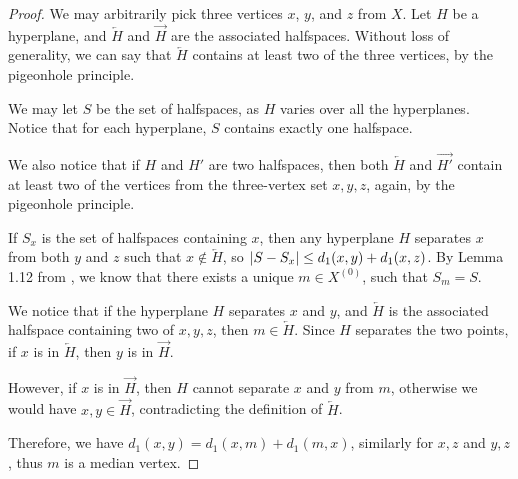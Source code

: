 \documentclass[12pt, a4paper]{article}
\theoremstyle{plain}
\theoremstyle{definition}
\theoremstyle{remark}
\begin{document}
    \begin{proof}
        We may arbitrarily pick three vertices $x$, $y$, and $z$ from $X$. Let $H$ be a hyperplane, and $\overleftarrow{H}$ and $\overrightarrow{H}$ are the associated halfspaces. Without loss of generality, we can say that $\overleftarrow{H}$ contains at least two of the three vertices, by the pigeonhole principle.
        
        We may let $S$ be the set of halfspaces, as $H$ varies over all the hyperplanes. Notice that for each hyperplane, $S$ contains exactly one halfspace.
        
        We also notice that if $H$ and $H'$ are two halfspaces, then both $\overleftarrow{H}$ and $\overrightarrow{H'}$ contain at least two of the vertices from the three-vertex set ${ x, y, z}$, again, by the pigeonhole principle.
        
        If $S_{x}$ is the set of halfspaces containing $x$, then any hyperplane $H$ separates $x$ from both $y$ and $z$ such that $x \notin \overleftarrow{H}$, so $\abs{S - S_{x}} \leq d_{1}(x, y) + d_{1}(x, z)$. By Lemma 1.12 from \cite{hagen}, we know that there exists a unique $m \in X^{(0)}$, such that $S_{m} = S$.
        
        We notice that if the hyperplane $H$ separates $x$ and $y$, and $\overleftarrow{H}$ is the associated halfspace containing two of ${ x, y, z}$, then $m \in \overleftarrow{H}$. Since $H$ separates the two points, if $x$ is in $\overleftarrow{H}$, then $y$ is in $\overrightarrow{H}$.
        
        However, if $x$ is in $\overrightarrow{H}$, then $H$ cannot separate $x$ and $y$ from $m$, otherwise we would have $x, y \in \overrightarrow{H}$, contradicting the definition of $\overleftarrow{H}$.
        
        Therefore, we have $d_{1}(x, y) = d_{1}(x, m) + d_{1}(m, x)$, similarly for $x, z$ and $y, z$, thus $m$ is a median vertex.
    \end{proof}
    
    \nocite{*}
    
    
    
\end{document}
